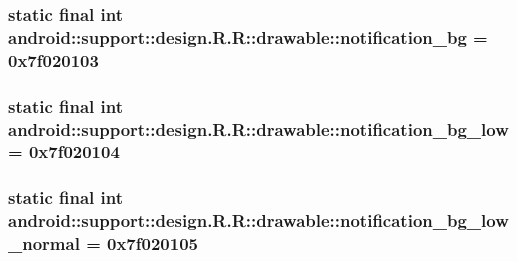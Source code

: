 \hypertarget{classandroid_1_1support_1_1design_1_1_r_1_1drawable_a1d6092cfc2e16ee16a2e35e7467040b}{
\subsubsection[{notification\_\-bg}]{\setlength{\rightskip}{0pt plus 5cm}static final int android::support::design.R.R::drawable::notification\_\-bg = 0x7f020103}}
\label{classandroid_1_1support_1_1design_1_1_r_1_1drawable_a1d6092cfc2e16ee16a2e35e7467040b}


\hypertarget{classandroid_1_1support_1_1design_1_1_r_1_1drawable_c34011ed559ffc07813875243b2bec09}{
\subsubsection[{notification\_\-bg\_\-low}]{\setlength{\rightskip}{0pt plus 5cm}static final int android::support::design.R.R::drawable::notification\_\-bg\_\-low = 0x7f020104}}
\label{classandroid_1_1support_1_1design_1_1_r_1_1drawable_c34011ed559ffc07813875243b2bec09}


\hypertarget{classandroid_1_1support_1_1design_1_1_r_1_1drawable_c81d1b38020e11547dbbda7c200d3326}{
\subsubsection[{notification\_\-bg\_\-low\_\-normal}]{\setlength{\rightskip}{0pt plus 5cm}static final int android::support::design.R.R::drawable::notification\_\-bg\_\-low\_\-normal = 0x7f020105}}
\label{classandroid_1_1support_1_1design_1_1_r_1_1drawable_c81d1b38020e11547dbbda7c200d3326}


